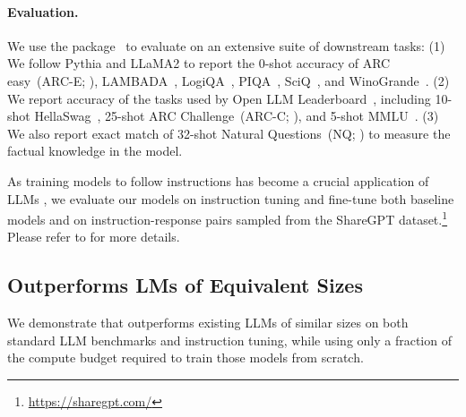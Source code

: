 





\paragraph{Evaluation.} %
We use the  package~\citep{eval-harness} to evaluate on an extensive suite of downstream tasks:
(1) We follow Pythia and LLaMA2 to report the 0-shot accuracy of ARC easy~(ARC-E; \citealp{clark2018think}), LAMBADA~\citep{paperno-etal-2016-lambada}, LogiQA~\citep{liu2020logiqa}, PIQA~\citep{bisk2020piqa}, SciQ~\citep{welbl-etal-2017-crowdsourcing}, and WinoGrande~\citep{sakaguchi2021winogrande}. 
(2) We report accuracy of the tasks used by Open LLM Leaderboard~\citep{open-llm-leaderboard}, including 10-shot  HellaSwag~\citep{zellers-etal-2019-hellaswag}, 25-shot  ARC Challenge~(ARC-C; \citealp{clark2018think}), and 5-shot MMLU~\citep{hendrycks2021measuring}. 
(3) We also report exact match of 32-shot  Natural Questions~(NQ; \citealp{kwiatkowski-etal-2019-natural})  to measure the factual knowledge in the model.  

As training models to follow instructions has become a crucial application of LLMs %
\citep{ouyang2022instructgpt,alpaca},
we evaluate our models on instruction tuning and fine-tune both baseline models and \ours{} on  
instruction-response pairs sampled from the ShareGPT dataset.\footnote{\url{https://sharegpt.com/}}
Please refer to   for more details.




\subsection{\ours{} Outperforms LMs of Equivalent Sizes}

We demonstrate that \ours{} outperforms existing LLMs of similar sizes on both standard LLM benchmarks and instruction tuning, while using only a fraction of the compute budget required to train those models from scratch.

